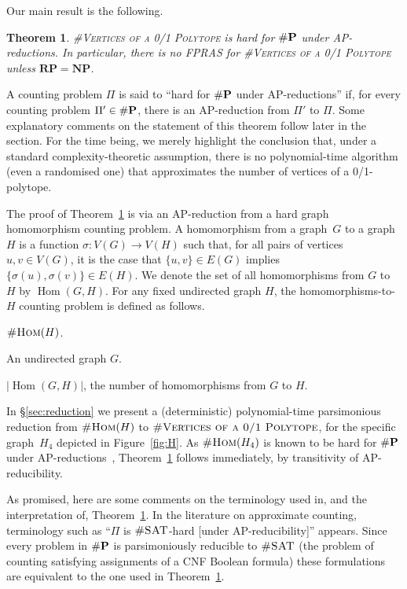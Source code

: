 \documentclass[11pt, oneside]{article}   	%
\newtheorem{theorem}{Theorem}
\def\NP{\ensuremath{\mathbf{NP}}}
\def\RP{\ensuremath{\mathbf{RP}}}
\def\numP{\textup{\#}\mathbf{P}}
\def\nSAT{\textsc{\#SAT}}
\def\nHom{\textsc{\#Hom}}
\def\nPolytopeVertices{\textsc{\#Vertices of a 0/1 Polytope}}
\def\Hom{\mathop{\mathrm{Hom}}}
\def\Hfour{H_4}
\begin{document}
Our main result is the following.
\begin{theorem}\label{thm:main}
\nPolytopeVertices{} is hard for $\numP$ under AP-reductions.  In particular, there is no FPRAS for  \nPolytopeVertices{} unless $\RP=\NP$.
\end{theorem}
A counting problem $\Pi$ is said to ``hard for $\numP$ under AP-reductions'' if, for every counting problem $\Pi'\in\numP$, there is an AP-reduction from $\Pi'$ to $\Pi$.  Some explanatory comments on the statement of this theorem follow later in the section.  For the time being, we merely highlight the conclusion that, under a standard complexity-theoretic assumption, there is no polynomial-time algorithm (even a randomised one) that approximates the number of vertices of a 0/1-polytope.  

The proof of Theorem~\ref{thm:main} is via an AP-reduction from a hard graph homomorphism counting problem.  A homomorphism from a graph~$G$ to a graph~$H$ is a function $\sigma:V(G)\to V(H)$ such that, for all pairs of vertices $u,v\in V(G)$, it is the case that $\{u,v\}\in E(G)$ implies $\{\sigma(u),\sigma(v)\}\in E(H)$.  We denote the set of all homomorphisms from $G$ to $H$ by $\Hom(G,H)$.  For any fixed undirected graph $H$, the homomorphisms-to-$H$ counting problem is defined  as follows.
\begin{description}[itemsep=0pt]
\item [Problem:] $\nHom(H)$.
\item [Instance:] An undirected graph $G$.
\item [Output:]  $|\Hom(G,H)|$, the number of homomorphisms from $G$ to $H$.
\end{description}
In \S\ref{sec:reduction} we present a (deterministic) polynomial-time parsimonious reduction from $\nHom(H)$ to $\nPolytopeVertices$, for the specific graph~$\Hfour$ depicted in Figure~\ref{fig:H}.  As $\nHom(\Hfour)$ is known to be hard for $\numP$ under AP-reductions~\cite{KelkThesis}, Theorem~\ref{thm:main} follows immediately, by transitivity of AP-reducibility.  

As promised, here are some comments on the terminology used in, and the interpretation of, Theorem~\ref{thm:main}.  In the literature on approximate counting, terminology such as ``$\Pi$ is $\nSAT$-hard [under AP-reducibility]'' appears.  Since every problem in $\numP$ is parsimoniously reducible to $\nSAT$ (the problem of counting satisfying assignments of a CNF Boolean formula) these formulations are equivalent to the one used in Theorem~\ref{thm:main}. 
\end{document}
